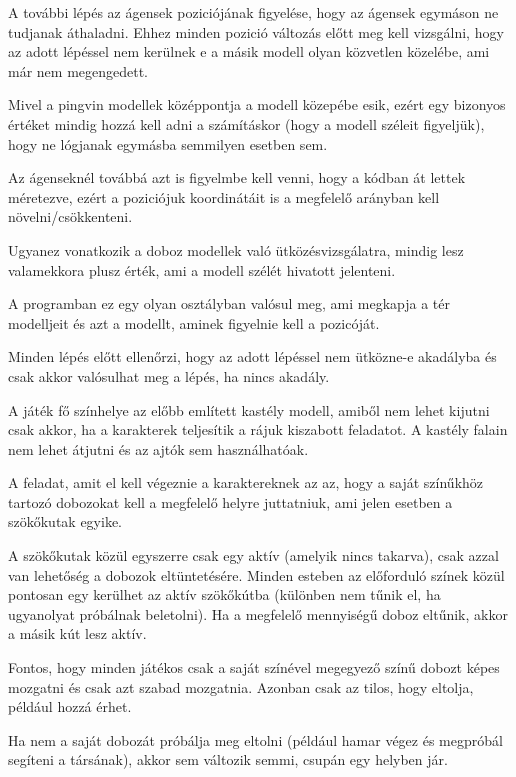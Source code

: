 A további lépés az ágensek poziciójának figyelése, hogy az ágensek egymáson ne tudjanak áthaladni. Ehhez minden pozició változás előtt meg kell vizsgálni, hogy az adott lépéssel nem kerülnek e a másik modell olyan közvetlen közelébe, ami már nem megengedett.

Mivel a pingvin modellek középpontja a modell közepébe esik, ezért egy bizonyos értéket mindig hozzá kell adni a számításkor (hogy a modell széleit figyeljük), hogy ne lógjanak egymásba semmilyen esetben sem. 

Az ágenseknél továbbá azt is figyelmbe kell venni, hogy a kódban át lettek méretezve, ezért a poziciójuk koordinátáit is a megfelelő arányban kell növelni/csökkenteni.

Ugyanez vonatkozik a doboz modellek való ütközésvizsgálatra, mindig lesz valamekkora plusz érték, ami a modell szélét hivatott jelenteni.

A programban ez egy olyan osztályban valósul meg, ami megkapja a tér modelljeit és azt a modellt, aminek figyelnie kell a pozicóját.
 
Minden lépés előtt ellenőrzi, hogy az adott lépéssel nem ütközne-e akadályba és csak akkor valósulhat meg a lépés, ha nincs akadály.


A játék fő színhelye az előbb említett kastély modell, amiből nem lehet kijutni csak akkor, ha a karakterek teljesítik a rájuk kiszabott feladatot.
A kastély falain nem lehet átjutni és az ajtók sem használhatóak.

A feladat, amit el kell végeznie a karaktereknek az az, hogy a saját színűkhöz tartozó dobozokat kell a megfelelő helyre juttatniuk, ami jelen esetben a szökőkutak egyike. 

A szökőkutak közül egyszerre csak egy aktív (amelyik nincs takarva), csak azzal van lehetőség a dobozok eltüntetésére. Minden esteben az előforduló színek közül pontosan egy kerülhet az aktív szökőkútba (különben nem tűnik el, ha ugyanolyat próbálnak beletolni). Ha a megfelelő mennyiségű doboz eltűnik, akkor a másik kút lesz aktív.

Fontos, hogy minden játékos csak a saját színével megegyező színű dobozt képes mozgatni és csak azt szabad mozgatnia. Azonban csak az tilos, hogy eltolja, például hozzá érhet.

Ha nem a saját dobozát próbálja meg eltolni (például hamar végez és megpróbál segíteni a társának), akkor sem változik semmi, csupán egy helyben jár.

